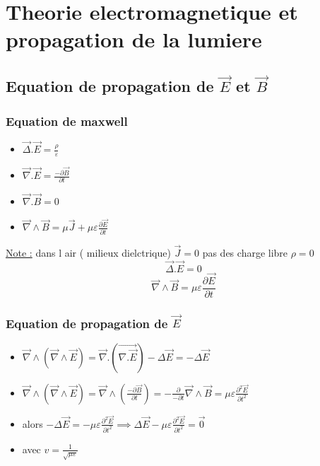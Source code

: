 \documentclass[12pt]{book}
\begin{document}
    \chapter{Theorie electromagnetique et propagation de la lumiere}
        \section{Equation de propagation de $\vec{E}$ et $\vec{B}$ }
            \subsection{Equation de maxwell}
                \begin{itemize}
                    \item $\vec{\Delta}.\vec{E} = \frac{\rho}{\varepsilon}$
                    \item $\vec{\nabla}.\vec{E} = \frac{-\partial \vec{B}}{\partial t}$
                    \item $\vec{\nabla}.\vec{B} = 0 $
                    \item $\vec{\nabla}\wedge\vec{B} = \mu \vec{J} + \mu \varepsilon \frac{\partial\vec{E}}{\partial t} $
                \end{itemize}
                \underline{Note :} dans l air ( milieux dielctrique) $\vec{J} =0 $ pas des charge libre $ \rho =0 $ 
                    \[ \vec{\Delta}.\vec{E} =0\]
                    \[ \vec{\nabla}\wedge\vec{B} = \mu \varepsilon \frac{\partial\vec{E}}{\partial t}\]
            \subsection{Equation de propagation de $\vec{E}$}
                \begin{itemize}
                    \item $\vec{\nabla}\wedge(\vec{\nabla}\wedge\vec{E}) =\vec{\nabla}.(\vec{\nabla.\vec{E}}) - \Delta\vec{E} = -\Delta\vec{E}$
                    \item $\vec{\nabla}\wedge(\vec{\nabla}\wedge\vec{E}) = \vec{\nabla}\wedge(\frac{-\partial\vec{B}}{\partial t})= - \frac{\partial}{-\partial t} \vec{\nabla}\wedge\vec{B} =\mu\varepsilon\frac{\partial^2\vec{E}}{\partial t^2}$
                    \item alors $-\Delta\vec{E} = -\mu\varepsilon\frac{\partial^2\vec{E}}{\partial t^2} \implies \Delta\vec{E} -\mu\varepsilon\frac{\partial^2\vec{E}}{\partial t^2} =\vec{0}$
                    \item \begin{center}
                        avec $ v= \frac{1}{\sqrt{\mu\varepsilon}}$
                        \end{center}
                \end{itemize}
\end{document}
